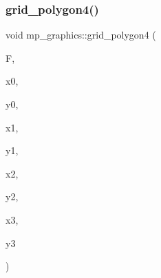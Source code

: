 \mbox{\label{classmp__graphics_aac97ca6f94984f0c29c66275f7dd90c7}} 
\subsubsection{\texorpdfstring{grid\+\_\+polygon4()}{grid\_polygon4()}}
{\footnotesize\ttfamily void mp\+\_\+graphics\+::grid\+\_\+polygon4 (\begin{DoxyParamCaption}\item[{\mbox{\hyperlink{structgrid__frame}{grid\+\_\+frame}} $\ast$}]{F,  }\item[{\mbox{\hyperlink{galois_8h_a09fddde158a3a20bd2dcadb609de11dc}{I\+NT}}}]{x0,  }\item[{\mbox{\hyperlink{galois_8h_a09fddde158a3a20bd2dcadb609de11dc}{I\+NT}}}]{y0,  }\item[{\mbox{\hyperlink{galois_8h_a09fddde158a3a20bd2dcadb609de11dc}{I\+NT}}}]{x1,  }\item[{\mbox{\hyperlink{galois_8h_a09fddde158a3a20bd2dcadb609de11dc}{I\+NT}}}]{y1,  }\item[{\mbox{\hyperlink{galois_8h_a09fddde158a3a20bd2dcadb609de11dc}{I\+NT}}}]{x2,  }\item[{\mbox{\hyperlink{galois_8h_a09fddde158a3a20bd2dcadb609de11dc}{I\+NT}}}]{y2,  }\item[{\mbox{\hyperlink{galois_8h_a09fddde158a3a20bd2dcadb609de11dc}{I\+NT}}}]{x3,  }\item[{\mbox{\hyperlink{galois_8h_a09fddde158a3a20bd2dcadb609de11dc}{I\+NT}}}]{y3 }\end{DoxyParamCaption})}

\mbox{\label{classmp__graphics_ac0a88ab5ddcf949ee1f90750a7b2fcd9}} 
